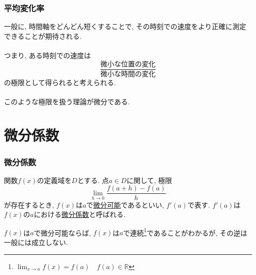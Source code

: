 

\begin{frame}
\frametitle{平均変化率}


一般に, 時間軸をどんどん短くすることで, その時刻での速度をより正確に測定できることが期待される.\\
\ \\

つまり, ある時刻での速度は
$$
\frac{\text{微小な位置の変化}}{\text{微小な時間の変化}}
$$
の極限として得られると考えられる. \\
\ \\

このような極限を扱う理論が微分である. 


\end{frame}



\section{微分係数}

\begin{frame}
\frametitle{微分係数}

\begin{Def}
関数$f(x)$の定義域を$D$とする. 
点$a \in D$に関して, 極限
$$
\lim_{h\to 0} \frac{f(a+h)-f(a)}{h}
$$
が存在するとき, $f(x)$は$a$で\underline{微分可能}であるといい, $f'(a)$で表す. 
$f'(a)$は$f(x)$の$a$における\underline{微分係数}と呼ばれる. 
\end{Def}

$f(x)$は$a$で微分可能ならば, $f(x)$は$a$で連続\footnote{$\lim_{x\to a} f(x) = f(a) \quad f(a) \in \mathbb{R}$}であることがわかるが, その逆は一般には成立しない. 



\end{frame}




